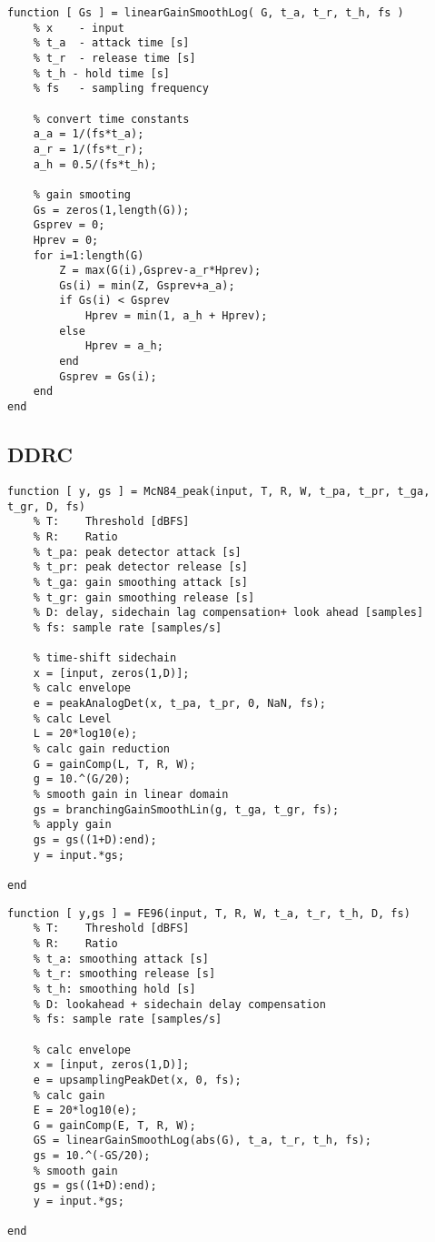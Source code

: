 \documentclass[../main2.tex]{subfiles}
\begin{document}
\begin{lstlisting}[style=customc]
function [ Gs ] = linearGainSmoothLog( G, t_a, t_r, t_h, fs )
    % x    - input
    % t_a  - attack time [s]
    % t_r  - release time [s]
    % t_h - hold time [s]
    % fs   - sampling frequency 

    % convert time constants
    a_a = 1/(fs*t_a);
    a_r = 1/(fs*t_r);
    a_h = 0.5/(fs*t_h);
    
    % gain smooting
    Gs = zeros(1,length(G));
    Gsprev = 0;
    Hprev = 0;
    for i=1:length(G)
        Z = max(G(i),Gsprev-a_r*Hprev);
        Gs(i) = min(Z, Gsprev+a_a); 
        if Gs(i) < Gsprev
            Hprev = min(1, a_h + Hprev);
        else 
            Hprev = a_h;
        end
        Gsprev = Gs(i);
    end
end
\end{lstlisting}
\subsection{DDRC}
\begin{lstlisting}[style=customc]
function [ y, gs ] = McN84_peak(input, T, R, W, t_pa, t_pr, t_ga, t_gr, D, fs)
    % T:    Threshold [dBFS]
    % R:    Ratio
    % t_pa: peak detector attack [s]
    % t_pr: peak detector release [s]
    % t_ga: gain smoothing attack [s]
    % t_gr: gain smoothing release [s]
    % D: delay, sidechain lag compensation+ look ahead [samples]
    % fs: sample rate [samples/s]

    % time-shift sidechain
    x = [input, zeros(1,D)];
    % calc envelope
    e = peakAnalogDet(x, t_pa, t_pr, 0, NaN, fs);
    % calc Level
    L = 20*log10(e);
    % calc gain reduction
    G = gainComp(L, T, R, W);
    g = 10.^(G/20);
    % smooth gain in linear domain
    gs = branchingGainSmoothLin(g, t_ga, t_gr, fs);
    % apply gain
    gs = gs((1+D):end);
    y = input.*gs;
    
end
\end{lstlisting}
\begin{lstlisting}[style=customc]
function [ y,gs ] = FE96(input, T, R, W, t_a, t_r, t_h, D, fs)
    % T:    Threshold [dBFS]
    % R:    Ratio
    % t_a: smoothing attack [s]
    % t_r: smoothing release [s]
    % t_h: smoothing hold [s]
    % D: lookahead + sidechain delay compensation
    % fs: sample rate [samples/s]
    
    % calc envelope
    x = [input, zeros(1,D)];
    e = upsamplingPeakDet(x, 0, fs);
    % calc gain
    E = 20*log10(e);
    G = gainComp(E, T, R, W);
    GS = linearGainSmoothLog(abs(G), t_a, t_r, t_h, fs);
    gs = 10.^(-GS/20);
    % smooth gain
    gs = gs((1+D):end);
    y = input.*gs;

end
\end{lstlisting}
\end{document}
